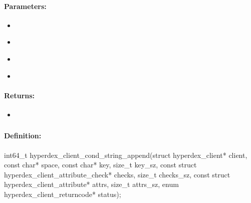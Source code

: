 \paragraph{Parameters:}
\begin{itemize}[noitemsep]
\item {}\\

\item {}\\

\item {}\\

\item {}\\

\end{itemize}

\paragraph{Returns:}
\begin{itemize}[noitemsep]
\item {}\\

\end{itemize}

\pagebreak
\subsubsection{}
\label{api:c:cond_string_append}


\paragraph{Definition:}
\begin{ccode}
int64_t hyperdex_client_cond_string_append(struct hyperdex_client* client,
        const char* space,
        const char* key, size_t key_sz,
        const struct hyperdex_client_attribute_check* checks, size_t checks_sz,
        const struct hyperdex_client_attribute* attrs, size_t attrs_sz,
        enum hyperdex_client_returncode* status);
\end{ccode}

